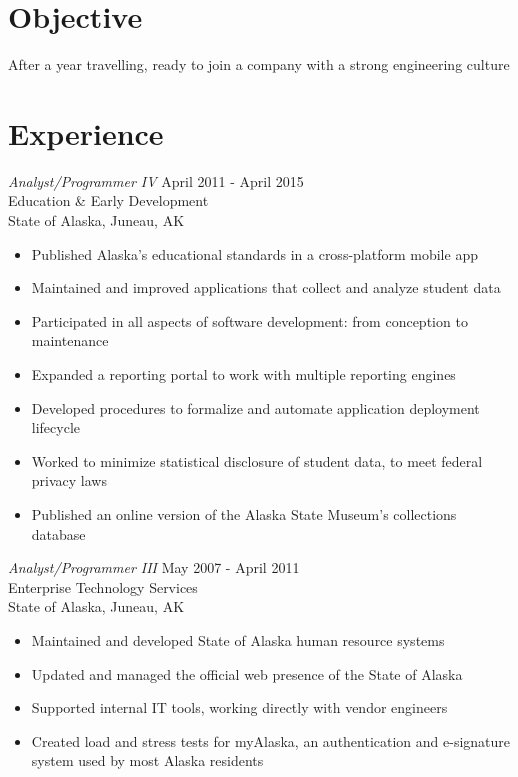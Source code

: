 \documentclass[line,margin]{res}
\begin{document}
\address{\href{mailto:amiller@alumni.uidaho.edu}{amiller@alumni.uidaho.edu}\\ (253) 336-6451}
\address{PO Box 7130\\ New York, NY 10116}
 
\begin{resume}
 
\section{Objective}       After a year travelling, ready to join a company with a strong engineering culture
\section{Experience} {\sl Analyst/Programmer IV} \hfill April 2011 - April 2015 \\
		Education \& Early Development \\
                State of Alaska, Juneau, AK
                \begin{itemize}  \itemsep -2pt %
        \item Published Alaska's educational standards in a cross-platform mobile app
        \item Maintained and improved applications that collect and analyze student data
		\item Participated in all aspects of software development: from conception to maintenance
		\item Expanded a reporting portal to work with multiple reporting engines
		\item Developed procedures to formalize and automate application deployment lifecycle
		\item Worked to minimize statistical disclosure of student data, to meet federal privacy laws
		\item Published an online version of the Alaska State Museum's collections database
                \end{itemize}

		{\sl Analyst/Programmer III} \hfill May 2007 - April 2011 \\
                Enterprise Technology Services \\
                State of Alaska, Juneau, AK
                \begin{itemize}  \itemsep -2pt %
		\item Maintained and developed State of Alaska human resource systems
		\item Updated and managed the official web presence of the State of Alaska
		\item Supported internal IT tools, working directly with vendor engineers
		\item Created load and stress tests for myAlaska, an authentication and e-signature system used by most Alaska residents
                \end{itemize}
 

\end{resume}
\end{document}
